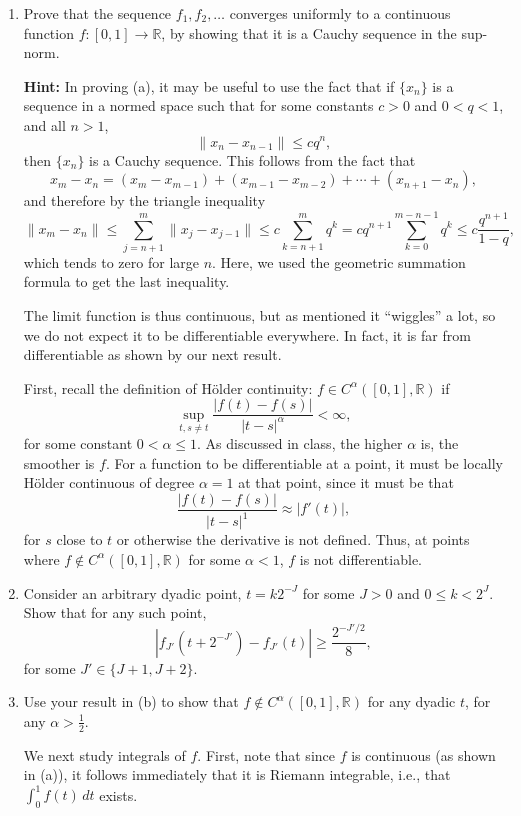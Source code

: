 \documentclass{article}
\begin{document}
\begin{enumerate}
\item[(a)] Prove that the sequence $f_1,f_2,\ldots$ converges uniformly to a continuous function $f:[0,1]\to \mathbb{R}$, by showing that it is a Cauchy sequence in the sup-norm.

\medskip
\noindent \textbf{Hint:} In proving (a), it may be useful to use the fact that if $\{x_n\}$ is a sequence in a normed space such that for some constants $c>0$ and $0<q<1$, and all $n>1$,
\[
\|x_n-x_{n-1}\|\le cq^n,
\]
then $\{x_n\}$ is a Cauchy sequence. This follows from the fact that
\[
x_m-x_n=(x_m-x_{m-1})+(x_{m-1}-x_{m-2})+\cdots+(x_{n+1}-x_n),
\]
and therefore by the triangle inequality
\[
\|x_m-x_n\|\le \sum_{j=n+1}^m \|x_j-x_{j-1}\|
\le c\sum_{k=n+1}^m q^k
= cq^{n+1}\sum_{k=0}^{m-n-1}q^k
\le c\frac{q^{n+1}}{1-q},
\]
which tends to zero for large $n$. Here, we used the geometric summation formula to get the last inequality.

\medskip
The limit function is thus continuous, but as mentioned it ``wiggles'' a lot, so we do not expect it to be differentiable everywhere. In fact, it is far from differentiable as shown by our next result.

First, recall the definition of H\"older continuity: $f\in C^\alpha([0,1],\mathbb{R})$ if
\[
\sup_{t,s\ne t}\frac{|f(t)-f(s)|}{|t-s|^\alpha}<\infty,
\]
for some constant $0<\alpha\le 1$.
As discussed in class, the higher $\alpha$ is, the smoother is $f$. For a function to be differentiable at a point, it must be locally H\"older continuous of degree $\alpha=1$ at that point, since it must be that
\[
\frac{|f(t)-f(s)|}{|t-s|^1}\approx |f'(t)|,
\]
for $s$ close to $t$ or otherwise the derivative is not defined.
Thus, at points where $f\notin C^\alpha([0,1],\mathbb{R})$ for some $\alpha<1$, $f$ is not differentiable.

\item[(b)] Consider an arbitrary dyadic point, $t=k2^{-J}$ for some $J>0$ and $0\le k<2^J$. Show that for any such point,
\[
\left|f_{J'}(t+2^{-J'})-f_{J'}(t)\right|\ge \frac{2^{-J'/2}}{8},
\]
for some $J'\in\{J+1,J+2\}$.

\item[(c)] Use your result in (b) to show that $f\notin C^\alpha([0,1],\mathbb{R})$ for any dyadic $t$, for any $\alpha>\frac12$.

\medskip
We next study integrals of $f$. First, note that since $f$ is continuous (as shown in (a)), it follows immediately that it is Riemann integrable, i.e., that $\int_0^1 f(t)\,dt$ exists.


\end{enumerate}
\end{document}
